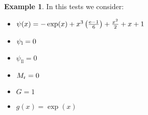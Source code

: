 \documentclass[11pt,a4paper]{article}
\theoremstyle{plain}
\theoremstyle{definition}
\newtheorem{exmp}[thm]{Example} %
\begin{document}
%
%
%
%
\pagebreak

%

\begin{exmp}
\label{Example:PRO:bending:01_23_glob2}
In this tests we consider:
\begin{itemize}
\item $\psi(x)=-\exp(x)+x^3\left(\frac{\text e-1}{6}\right)+\frac{x^2}{2}+x+1$
\item $\psi_\text l=0$
\item $\psi_\text{ll}=0$
\item $M_\text r=0$
\item $G=1$
\item $g(x)=\exp(x)$
\end{itemize}
\end{exmp}

%
%
%
%
\pagebreak

%
%
%
%
%
\pagebreak
\end{document}

